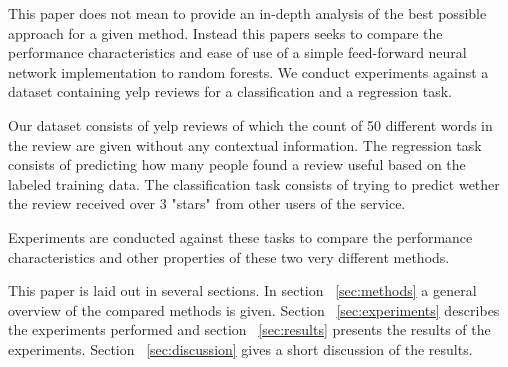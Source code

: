 
This paper does not mean to provide an in-depth analysis of the best possible approach for a given method. Instead this papers seeks to compare the performance characteristics and ease of use of a simple feed-forward neural network implementation to random forests. We conduct experiments against a dataset containing yelp reviews for a classification and a regression task.

Our dataset consists of yelp reviews of which the count of 50 different words in the review are given without any contextual information. The regression task consists of predicting how many people found a review useful based on the labeled training data. The classification task consists of trying to predict wether the review received over 3 "stars" from other users of the service.

Experiments are conducted against these tasks to compare the performance characteristics and other properties of these two very different methods.

This paper is laid out in several sections. In section ~\ref{sec:methods} a general overview of the compared methods is given. Section ~\ref{sec:experiments} describes the experiments performed and section ~\ref{sec:results} presents the results of the experiments. Section ~\ref{sec:discussion} gives a short discussion of the results.


